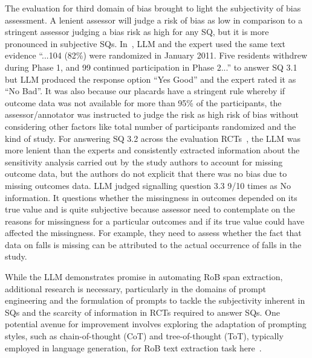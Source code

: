 \documentclass[sn-mathphys,Numbered]{sn-jnl}%
\theoremstyle{thmstyleone}%
\theoremstyle{thmstyletwo}%
\theoremstyle{thmstylethree}%
\begin{document}
The evaluation for third domain of bias brought to light the subjectivity of bias assessment. 
A lenient assessor will judge a risk of bias as low in comparison to a stringent assessor judging a bias risk as high for any SQ, but it is more pronounced in subjective SQs.
In~\cite{thorndike2014activity}, LLM and the expert used the same text evidence ``...104 (82\%) were randomized in January 2011. Five residents withdrew during Phase 1, and 99 continued participation in Phase 2...'' to answer SQ 3.1 but LLM produced the response option ``Yes Good'' and the expert rated it as ``No Bad''.
It was also because our placards have a stringent rule whereby if outcome data was not available for more than 95\% of the participants, the assessor/annotator was instructed to judge the risk as high risk of bias without considering other factors like total number of participants randomized and the kind of study.
For answering SQ 3.2 across the evaluation RCTs~\cite{myer2018integration,taylor2016novel}, the LLM was more lenient than the experts and consistently extracted information about the sensitivity analysis carried out by the study authors to account for missing outcome data, but the authors do not explicit that there was no bias due to missing outcomes data.
LLM judged signalling question 3.3 9/10 times as No information.
It questions whether the missingness in outcomes depended on its true value and is quite subjective because assessor need to contemplate on the reasons for missingness for a particular outcomes and if its true value could have affected the missingness.
For example, they need to assess whether the fact that data on falls is missing can be attributed to the actual occurrence of falls in the study.





While the LLM demonstrates promise in automating RoB span extraction, additional research is necessary, particularly in the domains of prompt engineering and the formulation of prompts to tackle the subjectivity inherent in SQs and the scarcity of information in RCTs required to answer SQs.
One potential avenue for improvement involves exploring the adaptation of prompting styles, such as chain-of-thought (CoT) and tree-of-thought (ToT), typically employed in language generation, for RoB text extraction task here~\cite{wei2022chain}.
%
%
%
\end{document}
